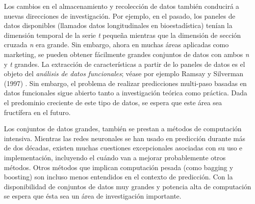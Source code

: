 \documentclass{llncs}
\begin{document}
Los cambios en el almacenamiento y recolección de datos también conducirá a nuevas direcciones de investigación. Por ejemplo, en el pasado, los paneles de datos disponibles (llamados datos longitudinales en bioestadística) tenían la dimensión temporal de la serie \emph{t} pequeña mientras que la dimensión de sección cruzada \emph{n} era grande. Sin embargo, ahora en muchas áreas aplicadas como marketing, se pueden obtener fácilmente grandes conjuntos de datos con ambos \emph{n} y \emph{t} grandes. La extracción de características a partir de lo paneles de datos es el objeto del \emph{análisis de datos funcionales}; véase por ejemplo  Ramsay y Silverman (1997) \cite{Ramsay1997}. Sin embargo, el problema de realizar predicciones multi-paso basadas en datos funcionales sigue abierto tanto a investigación teórica como práctica. Dada el predominio creciente de este tipo de datos, se espera que este área sea fructífera en el futuro.

Los conjuntos de datos grandes, también se prestan a métodos de computación intensiva. Mientras las redes neuronales se han usado en predicción durante más de dos décadas, existen muchas cuestiones excepcionales asociadas con su uso e implementación, incluyendo el cuándo van a mejorar probablemente otros métodos. Otros métodos que implican computación pesada (como bagging y boosting) son incluso menos entendidos en el contexto de predicción. Con la disponibilidad de conjuntos de datos muy grandes y potencia alta de computación se espera que ésta sea un área de investigación importante.





\end{document}
